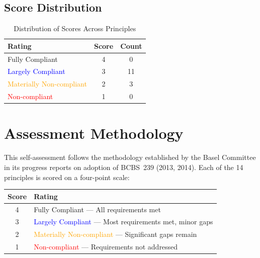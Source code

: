 \documentclass[11pt]{article}
\begin{document}
\subsection{Score Distribution}

\begin{table}[H]
    \centering
    \caption{Distribution of Scores Across Principles}
    \begin{tabular}{lcc}
        \toprule
        \textbf{Rating} & \textbf{Score} & \textbf{Count} \\
        \midrule
        \textcolor{green!60!black}{Fully Compliant} & 4 & 0 \\
        \textcolor{blue}{Largely Compliant} & 3 & 11 \\
        \textcolor{orange}{Materially Non-compliant} & 2 & 3 \\
        \textcolor{red}{Non-compliant} & 1 & 0 \\
        \bottomrule
    \end{tabular}
\end{table}

\clearpage

\section{Assessment Methodology}

This self-assessment follows the methodology established by the Basel Committee
in its progress reports on adoption of BCBS~239 (2013, 2014). Each of the 14
principles is scored on a four-point scale:

\begin{table}[H]
    \centering
    \begin{tabular}{cl}
        \toprule
        \textbf{Score} & \textbf{Rating} \\
        \midrule
        4 & \textcolor{green!60!black}{Fully Compliant} --- All requirements met \\
        3 & \textcolor{blue}{Largely Compliant} --- Most requirements met, minor gaps \\
        2 & \textcolor{orange}{Materially Non-compliant} --- Significant gaps remain \\
        1 & \textcolor{red}{Non-compliant} --- Requirements not addressed \\
        \bottomrule
    \end{tabular}
\end{table}
\end{document}
